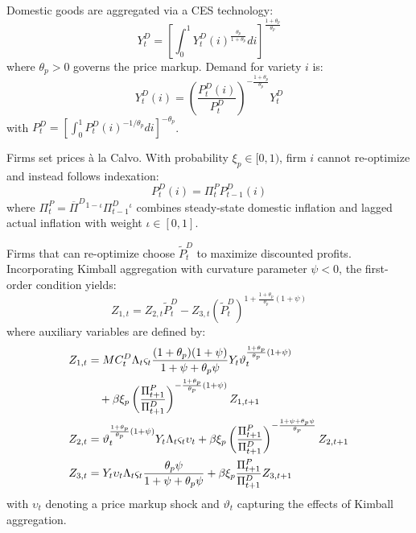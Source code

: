 \documentclass[12pt]{article}
\begin{document}
Domestic goods are aggregated via a CES technology:
\begin{equation}
Y_t^D = \left[ \int_0^1 Y_t^D(i)^{\frac{\theta_p}{1+\theta_p}} di \right]^{\frac{1+\theta_p}{\theta_p}}
\end{equation}
where $\theta_p > 0$ governs the price markup. Demand for variety $i$ is:
\begin{equation}
Y_t^D(i) = \left( \frac{P_t^D(i)}{P_t^D} \right)^{-\frac{1+\theta_p}{\theta_p}} Y_t^D
\end{equation}
with $P_t^D = \left[ \int_0^1 P_t^D(i)^{-1/\theta_p} di \right]^{-\theta_p}$.

Firms set prices à la Calvo. With probability $\xi_p \in [0,1)$, firm $i$ cannot re-optimize and instead follows indexation:
\begin{equation}
P_t^D(i) = \Pi_t^P P_{t-1}^D(i)
\end{equation}
where $\Pi_t^P = \overline{\Pi}^D {}^{1-\iota} \Pi_{t-1}^D {}^{\iota}$ combines steady-state domestic inflation and lagged actual inflation with weight $\iota \in [0,1]$.

Firms that can re-optimize choose $\tilde{P}_t^D$ to maximize discounted profits. Incorporating Kimball aggregation \citep{kimball1995quantitative} with curvature parameter $\psi < 0$, the first-order condition yields:
\begin{equation}
Z_{1,t} = Z_{2,t} \tilde{P}_t^D - Z_{3,t} (\tilde{P}_t^D)^{1 + \frac{1+\theta_p}{\theta_p}(1+\psi)}
\end{equation}
where auxiliary variables are defined by:
\begin{align}
Z_{1,t} &= MC_t^D \Lambda_t \varsigma_t \frac{(1+\theta_p)(1+\psi)}{1+\psi+\theta_p\psi} Y_t \vartheta_t^{\frac{1+\theta_p}{\theta_p}(1+\psi)} \notag \\
&\quad + \beta \xi_p \left( \frac{\Pi_{t+1}^P}{\Pi_{t+1}^D} \right)^{-\frac{1+\theta_p}{\theta_p}(1+\psi)} Z_{1,t+1} \label{eq:z1} \\
Z_{2,t} &= \vartheta_t^{\frac{1+\theta_p}{\theta_p}(1+\psi)} Y_t \Lambda_t \varsigma_t \upsilon_t + \beta \xi_p \left( \frac{\Pi_{t+1}^P}{\Pi_{t+1}^D} \right)^{-\frac{1+\psi+\theta_p\psi}{\theta_p}} Z_{2,t+1} \label{eq:z2} \\
Z_{3,t} &= Y_t \upsilon_t \Lambda_t \varsigma_t \frac{\theta_p \psi}{1+\psi+\theta_p\psi} + \beta \xi_p \frac{\Pi_{t+1}^P}{\Pi_{t+1}^D} Z_{3,t+1} \label{eq:z3}
\end{align}
with $\upsilon_t$ denoting a price markup shock and $\vartheta_t$ capturing the effects of Kimball aggregation.
\end{document}
